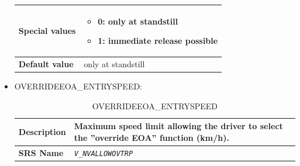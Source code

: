 \documentclass{template/openetcs}
\begin{document}
\begin{itemize}
\begin{longtable}{|l|l|}
				\hline
																																
					\begin{minipage}[t]{0.22\linewidth} \textbf{Special values}	\end{minipage} 
				&	\begin{minipage}[t]{0.78\linewidth} \begin{itemize} \item 0: only at standstill \item 1: immediate release possible \end{itemize} \end{minipage} \\
								
				\hline
										
					\begin{minipage}[t]{0.22\linewidth} \textbf{Default value}	\end{minipage} 
				&	\begin{minipage}[t]{0.78\linewidth} only at standstill \end{minipage} \\
				
				\hline
				
			\end{longtable}
		\item OVERRIDEEOA\_ENTRYSPEED:
		
			\begin{longtable}{|l|l|}
				\caption{OVERRIDEEOA\_ENTRYSPEED}\\ 																	
				\hline
				
					\begin{minipage}[t]{0.22\linewidth} \textbf{Description}	\end{minipage} 
				&	\begin{minipage}[t]{0.78\linewidth} Maximum speed limit allowing the driver to select the ”override EOA” function (km/h). \end{minipage} \\
				
				\hline
				
					\begin{minipage}[t]{0.22\linewidth} \textbf{SRS Name}	\end{minipage} 
				&	\begin{minipage}[t]{0.78\linewidth} \emph{\texttt{V\_NVALLOWOVTRP}} \end{minipage} \\
				
				\hline
																																

\end{longtable}
\end{itemize}
\end{document}

